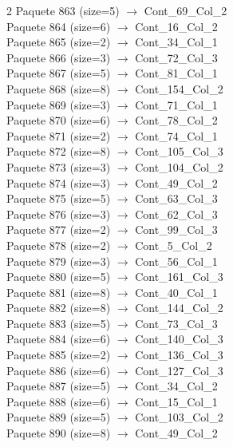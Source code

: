 \begin{multicols}{2}
Paquete 863 (size=5) $\rightarrow$ Cont\_69\_Col\_2\\
Paquete 864 (size=6) $\rightarrow$ Cont\_16\_Col\_2\\
Paquete 865 (size=2) $\rightarrow$ Cont\_34\_Col\_1\\
Paquete 866 (size=3) $\rightarrow$ Cont\_72\_Col\_3\\
Paquete 867 (size=5) $\rightarrow$ Cont\_81\_Col\_1\\
Paquete 868 (size=8) $\rightarrow$ Cont\_154\_Col\_2\\
Paquete 869 (size=3) $\rightarrow$ Cont\_71\_Col\_1\\
Paquete 870 (size=6) $\rightarrow$ Cont\_78\_Col\_2\\
Paquete 871 (size=2) $\rightarrow$ Cont\_74\_Col\_1\\
Paquete 872 (size=8) $\rightarrow$ Cont\_105\_Col\_3\\
Paquete 873 (size=3) $\rightarrow$ Cont\_104\_Col\_2\\
Paquete 874 (size=3) $\rightarrow$ Cont\_49\_Col\_2\\
Paquete 875 (size=5) $\rightarrow$ Cont\_63\_Col\_3\\
Paquete 876 (size=3) $\rightarrow$ Cont\_62\_Col\_3\\
Paquete 877 (size=2) $\rightarrow$ Cont\_99\_Col\_3\\
Paquete 878 (size=2) $\rightarrow$ Cont\_5\_Col\_2\\
Paquete 879 (size=3) $\rightarrow$ Cont\_56\_Col\_1\\
Paquete 880 (size=5) $\rightarrow$ Cont\_161\_Col\_3\\
Paquete 881 (size=8) $\rightarrow$ Cont\_40\_Col\_1\\
Paquete 882 (size=8) $\rightarrow$ Cont\_144\_Col\_2\\
Paquete 883 (size=5) $\rightarrow$ Cont\_73\_Col\_3\\
Paquete 884 (size=6) $\rightarrow$ Cont\_140\_Col\_3\\
Paquete 885 (size=2) $\rightarrow$ Cont\_136\_Col\_3\\
Paquete 886 (size=6) $\rightarrow$ Cont\_127\_Col\_3\\
Paquete 887 (size=5) $\rightarrow$ Cont\_34\_Col\_2\\
Paquete 888 (size=6) $\rightarrow$ Cont\_15\_Col\_1\\
Paquete 889 (size=5) $\rightarrow$ Cont\_103\_Col\_2\\
Paquete 890 (size=8) $\rightarrow$ Cont\_49\_Col\_2\\

\end{multicols}

